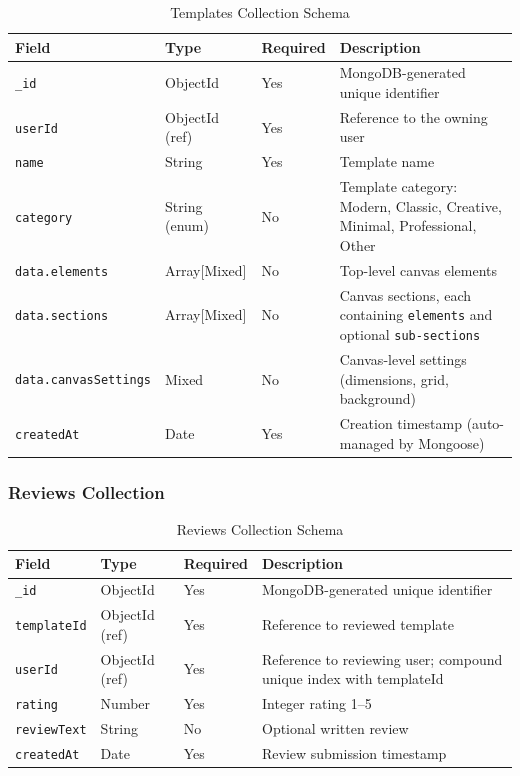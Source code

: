 \documentclass[12pt, a4paper, oneside]{report}
\begin{document}
\begin{table}[H]
\centering
\caption{Templates Collection Schema}
\label{tab:schema_templates}
\renewcommand{\arraystretch}{1.4}
\begin{tabularx}{\textwidth}{|p{3.5cm}|p{2.5cm}|p{1.5cm}|X|}
\hline
\textbf{Field} & \textbf{Type} & \textbf{Required} & \textbf{Description} \\
\hline
\texttt{\_id} & ObjectId & Yes & MongoDB-generated unique identifier \\
\hline
\texttt{userId} & ObjectId (ref) & Yes & Reference to the owning user \\
\hline
\texttt{name} & String & Yes & Template name \\
\hline
\texttt{category} & String (enum) & No & Template category: Modern, Classic, Creative, Minimal, Professional, Other \\
\hline
\texttt{data.elements} & Array[Mixed] & No & Top-level canvas elements \\
\hline
\texttt{data.sections} & Array[Mixed] & No & Canvas sections, each containing \texttt{elements} and optional \texttt{sub-sections} \\
\hline
\texttt{data.canvasSettings} & Mixed & No & Canvas-level settings (dimensions, grid, background) \\
\hline
\texttt{createdAt} & Date & Yes & Creation timestamp (auto-managed by Mongoose) \\
\hline
\end{tabularx}
\end{table}

\subsubsection{Reviews Collection}

\begin{table}[H]
\centering
\caption{Reviews Collection Schema}
\label{tab:schema_reviews}
\renewcommand{\arraystretch}{1.4}
\begin{tabularx}{\textwidth}{|p{3.5cm}|p{2.5cm}|p{1.5cm}|X|}
\hline
\textbf{Field} & \textbf{Type} & \textbf{Required} & \textbf{Description} \\
\hline
\texttt{\_id} & ObjectId & Yes & MongoDB-generated unique identifier \\
\hline
\texttt{templateId} & ObjectId (ref) & Yes & Reference to reviewed template \\
\hline
\texttt{userId} & ObjectId (ref) & Yes & Reference to reviewing user; compound unique index with templateId \\
\hline
\texttt{rating} & Number & Yes & Integer rating 1--5 \\
\hline
\texttt{reviewText} & String & No & Optional written review \\
\hline
\texttt{createdAt} & Date & Yes & Review submission timestamp \\
\hline
\end{tabularx}
\end{table}
\end{document}
